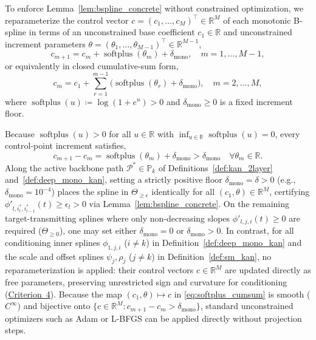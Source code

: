 \documentclass[11pt,a4paper]{article}
\theoremstyle{plain}
\theoremstyle{definition}
\theoremstyle{remark}
\begin{document}
To enforce Lemma~\ref{lem:bspline_concrete} without constrained optimization, we reparameterize the control vector $c = (c_1, \dots, c_M)^\top \in \mathbb{R}^M$ of each monotonic B-spline in terms of an unconstrained base coefficient $c_1 \in \mathbb{R}$ and unconstrained increment parameters $\theta = (\theta_1, \dots, \theta_{M-1})^\top \in \mathbb{R}^{M-1}$,
\begin{equation}
    c_{m+1} = c_m + \operatorname{softplus}(\theta_m) + \delta_{\text{mono}}, \quad m = 1, \dots, M-1,
    \label{eq:softplus_reparam}
\end{equation}
or equivalently in closed cumulative-sum form,
\begin{equation}
    c_m = c_1 + \sum_{r=1}^{m-1} \Big( \operatorname{softplus}(\theta_r) + \delta_{\text{mono}} \Big), \quad m = 2, \dots, M,
    \label{eq:softplus_cumsum}
\end{equation}
where $\operatorname{softplus}(u) \coloneqq \log(1 + e^u) > 0$ and $\delta_{\text{mono}} \ge 0$ is a fixed increment floor.

Because $\operatorname{softplus}(u) > 0$ for all $u \in \mathbb{R}$ with $\inf_{u \in \mathbb{R}} \operatorname{softplus}(u) = 0$, every control-point increment satisfies,
\begin{equation}
    c_{m+1} - c_m = \operatorname{softplus}(\theta_m) + \delta_{\text{mono}} > \delta_{\text{mono}} \quad \forall \theta_m \in \mathbb{R}.
\end{equation}
Along the active backbone path $\mathcal{P}^* \in \mathbb{P}_k$ of Definitions~\ref{def:kan_2layer} and~\ref{def:deep_mono_kan}, setting a strictly positive floor $\delta_{\text{mono}} = \delta > 0$ (e.g., $\delta_{\text{mono}} = 10^{-4}$) places the spline in $\Theta_{\ge \epsilon}$ identically for all $(c_1, \theta) \in \mathbb{R}^M$, certifying $\phi'_{l, i_l^*, i_{l-1}^*}(t) \ge \epsilon_l > 0$ via Lemma~\ref{lem:bspline_concrete}. On the remaining target-transmitting splines where only non-decreasing slopes $\phi'_{l, j, i}(t) \ge 0$ are required ($\Theta_{\ge 0}$), one may set either $\delta_{\text{mono}} = 0$ or $\delta_{\text{mono}} > 0$. In contrast, for all conditioning inner splines $\phi_{1, j, i}$ ($i \neq k$) in Definition~\ref{def:deep_mono_kan} and the scale and offset splines $\psi_j, \rho_j$ ($j \neq k$) in Definition~\ref{def:sm_kan}, no reparameterization is applied: their control vectors $c \in \mathbb{R}^M$ are updated directly as free parameters, preserving unrestricted sign and curvature for conditioning (\hyperref[crit:conditioning_freedom]{Criterion~4}). Because the map $(c_1, \theta) \mapsto c$ in \eqref{eq:softplus_cumsum} is smooth ($C^\infty$) and bijective onto $\{c \in \mathbb{R}^M : c_{m+1} - c_m > \delta_{\text{mono}}\}$, standard unconstrained optimizers such as Adam or L-BFGS can be applied directly without projection steps.
\end{document}
